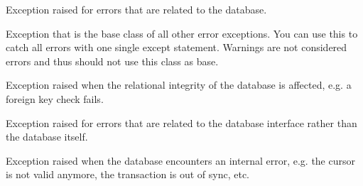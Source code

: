 \documentclass[letterpaper,10pt,english]{sphinxmanual}
\begin{document}
\begin{fulllineitems}
Exception raised for errors that are related to the database.

\end{fulllineitems}



\begin{fulllineitems}
Exception that is the base class of all other error exceptions.
You can use this to catch all errors with one single except statement.
Warnings are not considered errors and thus should not use this class as base.

\end{fulllineitems}



\begin{fulllineitems}
Exception raised when the relational integrity of the database is affected, e.g. a foreign key check fails.

\end{fulllineitems}



\begin{fulllineitems}
Exception raised for errors that are related to the database interface rather than the database itself.

\end{fulllineitems}



\begin{fulllineitems}
Exception raised when the database encounters an internal error, e.g. the cursor is not valid anymore,
the transaction is out of sync, etc.

\end{fulllineitems}
\end{document}
